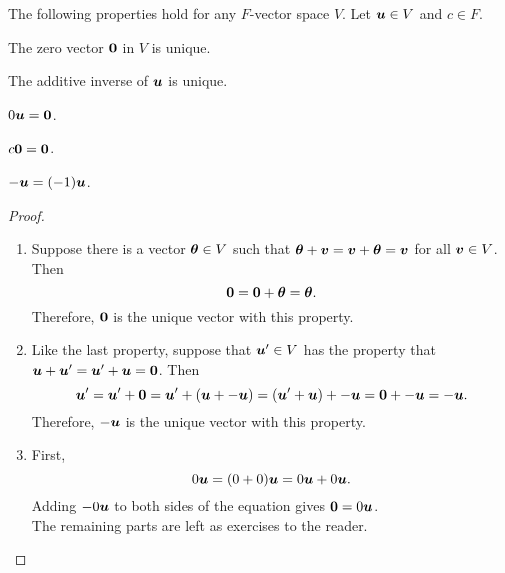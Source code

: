 \begin{Thm}\label{thm:vectorprop} The following properties hold for any $F$-vector space $V$. Let $\boldsymbol u \in V$ and $c\in F$.
\begin{enumerate}[!THM!, start=1]
\begin{multicols}{2}
\item\label{item:vectorpropuniquezero} The zero vector $\boldsymbol 0$ in $V$ is unique.\\
\item\label{item:vectorpropuniqueinverse} The additive inverse of $\boldsymbol u$ is unique.\\
\end{multicols}
\begin{multicols}{3}
\item\label{item:vectorpropzeroscalar} $0\boldsymbol u = \boldsymbol 0$.\\
\item\label{thm:vectorpropzerovector} $c\boldsymbol 0 = \boldsymbol 0$.\columnbreak
\item\label{thm:vectorpropnegscalar} $-\boldsymbol u = (-1)\boldsymbol u$.
\end{multicols}
\end{enumerate}
\end{Thm}
\begin{proof}
\begin{enumerate}[!DEF!,start=1]
\item Suppose there is a vector $\boldsymbol\theta \in V$ such that $\boldsymbol\theta + \boldsymbol v = \boldsymbol v + \boldsymbol\theta = \boldsymbol v$ for all $\boldsymbol v\in V$. Then 
\[\boldsymbol 0 = \boldsymbol 0 + \boldsymbol \theta = \boldsymbol \theta.\] Therefore, $\boldsymbol 0$ is the unique vector with this property.\\

\item Like the last property, suppose that $\boldsymbol u' \in V$ has the property that $\boldsymbol u + \boldsymbol u' = \boldsymbol u' + \boldsymbol u = \boldsymbol 0$. Then
\[\boldsymbol u' = \boldsymbol u' + \boldsymbol 0 = \boldsymbol u' + (\boldsymbol u + -\boldsymbol u) = (\boldsymbol u' + \boldsymbol u) + -\boldsymbol u = \boldsymbol 0 + -\boldsymbol u = -\boldsymbol u.\] Therefore, $-\boldsymbol u$ is the unique vector with this property.\\

\item First, \[0\boldsymbol u = (0+0)\boldsymbol u = 0\boldsymbol u + 0\boldsymbol u.\] Adding $-0\boldsymbol u$ to both sides of the equation gives $\boldsymbol 0 = 0\boldsymbol u$.\\

The remaining parts are left as exercises to the reader.\hfill$\qedhere$
%
\end{enumerate}
\end{proof}

